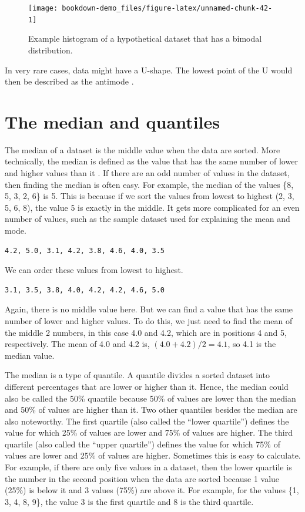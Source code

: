 \documentclass[
]{scrbook}
\begin{document}
\begin{figure}
\texttt{[image: bookdown-demo\_files/figure-latex/unnamed-chunk-42-1]} \caption{Example histogram of a hypothetical dataset that has a bimodal distribution.}\label{fig:unnamed-chunk-42}
\end{figure}

In very rare cases, data might have a U-shape.
The lowest point of the U would then be described as the antimode \citep{Sokal1995}.

\hypertarget{the-median-and-quantiles}{%
\section{The median and quantiles}\label{the-median-and-quantiles}}

The median of a dataset is the middle value when the data are sorted.
More technically, the median is defined as the value that has the same number of lower and higher values than it \citep{Sokal1995}.
If there are an odd number of values in the dataset, then finding the median is often easy.
For example, the median of the values \{8, 5, 3, 2, 6\} is 5.
This is because if we sort the values from lowest to highest (2, 3, 5, 6, 8), the value 5 is exactly in the middle.
It gets more complicated for an even number of values, such as the sample dataset used for explaining the mean and mode.

\begin{verbatim}
4.2, 5.0, 3.1, 4.2, 3.8, 4.6, 4.0, 3.5
\end{verbatim}

We can order these values from lowest to highest.

\begin{verbatim}
3.1, 3.5, 3.8, 4.0, 4.2, 4.2, 4.6, 5.0
\end{verbatim}

Again, there is no middle value here.
But we can find a value that has the same number of lower and higher values.
To do this, we just need to find the mean of the middle 2 numbers, in this case 4.0 and 4.2, which are in positions 4 and 5, respectively.
The mean of 4.0 and 4.2 is, \((4.0 + 4.2)/2 = 4.1\), so 4.1 is the median value.

The median is a type of quantile.
A quantile divides a sorted dataset into different percentages that are lower or higher than it.
Hence, the median could also be called the 50\% quantile because 50\% of values are lower than the median and 50\% of values are higher than it.
Two other quantiles besides the median are also noteworthy.
The first quartile (also called the ``lower quartile'') defines the value for which 25\% of values are lower and 75\% of values are higher.
The third quartile (also called the ``upper quartile'') defines the value for which 75\% of values are lower and 25\% of values are higher.
Sometimes this is easy to calculate.
For example, if there are only five values in a dataset, then the lower quartile is the number in the second position when the data are sorted because 1 value (25\%) is below it and 3 values (75\%) are above it.
For example, for the values \{1, 3, 4, 8, 9\}, the value 3 is the first quartile and 8 is the third quartile.
\end{document}
